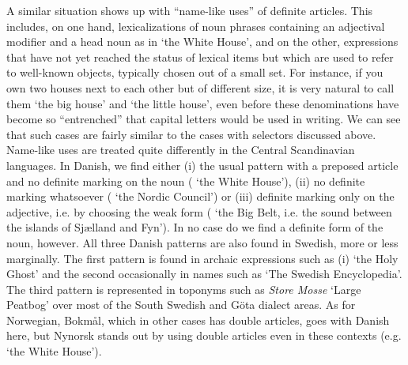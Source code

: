 A similar situation shows up with “name-like uses” of definite articles. This includes, on one hand, lexicalizations of noun phrases containing an adjectival modifier and a head noun as in  ‘the White House’, and on the other, expressions that have not yet reached the status of lexical items but which are used to refer to well-known objects, typically chosen out of a small set. For instance, if you own two houses next to each other but of different size, it is very natural to call them  ‘the big house’ and  ‘the little house’, even before these denominations have become so “entrenched” that capital letters would be used in writing. We can see that such cases are fairly similar to the cases with selectors discussed above. Name-like uses are treated quite differently in the Central Scandinavian languages. In Danish, we find either (i) the usual pattern with a preposed article and no definite marking on the noun ( ‘the White House’), (ii) no definite marking whatsoever ( ‘the Nordic Council’) or (iii) definite marking only on the adjective, i.e. by choosing the weak form ( ‘the Big Belt, i.e. the sound between the islands of Sjælland and Fyn’). In no case do we find a definite form of the noun, however. All three Danish patterns are also found in Swedish, more or less marginally. The first pattern is found in archaic expressions such as (i)  ‘the Holy Ghost’ and the second occasionally in names such as   ‘The Swedish Encyclopedia’. The third pattern is represented in toponyms such as \textit{Store Mosse} ‘Large Peatbog’ over most of the South Swedish and Göta dialect areas. As for Norwegian, Bokmål, which in other cases has double articles, goes with Danish here, but Nynorsk stands out by using double articles even in these contexts (e.g.  ‘the White House’). 


